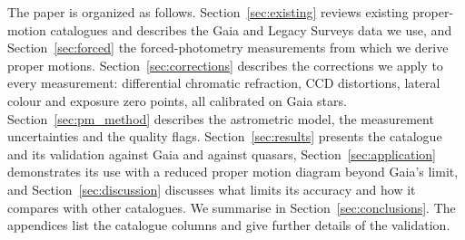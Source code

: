 \documentclass[usenatbib]{mnras}   %
\begin{document}
The paper is organized as follows. Section~\ref{sec:existing} reviews existing proper-motion catalogues and describes the Gaia and Legacy Surveys data we use, and Section~\ref{sec:forced} the forced-photometry measurements from which we derive proper motions. Section~\ref{sec:corrections} describes the corrections we apply to every measurement: differential chromatic refraction, CCD distortions, lateral colour and exposure zero points, all calibrated on Gaia stars. Section~\ref{sec:pm_method} describes the astrometric model, the measurement uncertainties and the quality flags. Section~\ref{sec:results} presents the catalogue and its validation against Gaia and against quasars, Section~\ref{sec:application} demonstrates its use with a reduced proper motion diagram beyond Gaia's limit, and Section~\ref{sec:discussion} discusses what limits its accuracy and how it compares with other catalogues. We summarise in Section~\ref{sec:conclusions}. The appendices list the catalogue columns and give further details of the validation.




\end{document}
